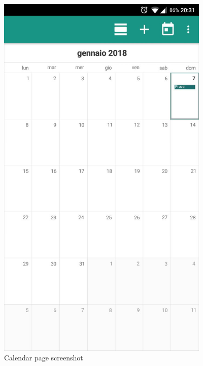 \begin{figure}
	\centering
	\includegraphics[width=4in]{./screenshots/Androidcalendar.jpg}
	\caption{Calendar page screenshot}
	\label{fig:droidcalendar}
\end{figure}

